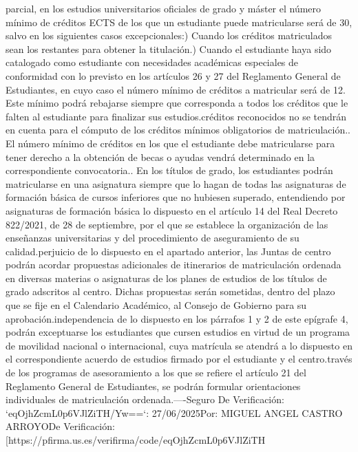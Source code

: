 \documentclass{article}
\begin{document}
\begin{itemize}
parcial, en los estudios universitarios oficiales de grado y máster el número mínimo de créditos ECTS de los que un estudiante puede matricularse será de 30, salvo en los siguientes casos excepcionales:\n\na) Cuando los créditos matriculados sean los restantes para obtener la titulación.\n\nb) Cuando el estudiante haya sido catalogado como estudiante con necesidades académicas especiales de conformidad con lo previsto en los artículos 26 y 27 del Reglamento General de Estudiantes, en cuyo caso el número mínimo de créditos a matricular será de 12. Este mínimo podrá rebajarse siempre que corresponda a todos los créditos que le falten al estudiante para finalizar sus estudios.\n\nLos créditos reconocidos no se tendrán en cuenta para el cómputo de los créditos mínimos obligatorios de matriculación.\n{}. El número mínimo de créditos en los que el estudiante debe matricularse para tener derecho a la obtención de becas o ayudas vendrá determinado en la correspondiente convocatoria.\n{}. En los títulos de grado, los estudiantes podrán matricularse en una asignatura siempre que lo hagan de todas las asignaturas de formación básica de cursos inferiores que no hubiesen superado, entendiendo por asignaturas de formación básica lo dispuesto en el artículo 14 del Real Decreto 822/2021, de 28 de septiembre, por el que se establece la organización de las enseñanzas universitarias y del procedimiento de aseguramiento de su calidad.\n\nSin perjuicio de lo dispuesto en el apartado anterior, las Juntas de centro podrán acordar propuestas adicionales de itinerarios de matriculación ordenada en diversas materias o asignaturas de los planes de estudios de los títulos de grado adscritos al centro. Dichas propuestas serán sometidas, dentro del plazo que se fije en el Calendario Académico, al Consejo de Gobierno para su aprobación.\n\nCon independencia de lo dispuesto en los párrafos 1 y 2 de este epígrafe 4, podrán exceptuarse los estudiantes que cursen estudios en virtud de un programa de movilidad nacional o internacional, cuya matrícula se atendrá a lo dispuesto en el correspondiente acuerdo de estudios firmado por el estudiante y el centro.\n\nA través de los programas de asesoramiento a los que se refiere el artículo 21 del Reglamento General de Estudiantes, se podrán formular orientaciones individuales de matriculación ordenada.\n\n----\n{} Seguro De Verificación: `eqOjhZcmL0p6VJlZiTH/Yw==`\nFecha: 27/06/2025\nFirmado Por: MIGUEL ANGEL CASTRO ARROYO\nUrl De Verificación: [https://pfirma.us.es/verifirma/code/eqOjhZcmL0p6VJlZiTH%
\end{itemize}
\end{document}
